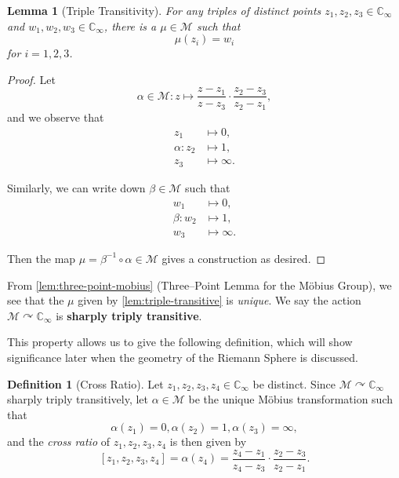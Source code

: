 \documentclass{article}
\newtheorem{lemma}[theorem]{Lemma}
\theoremstyle{definition}
\newtheorem{definition}[theorem]{Definition}
\theoremstyle{remark}
\newcommand{\pqty}[1]{\left(#1\right)}
\newcommand{\bqty}[1]{\left[#1\right]}
\newcommand{\functionmap}[3]{#1:#2\mapsto #3}
\newcommand{\inverse}{^{-1}}
\newcommand{\actson}{\curvearrowright}
\newcommand{\CC}{\mathbb{C}}
\newcommand{\compactify}{_{\infty}}
\newcommand{\mobius}{\mathcal{M}}
\begin{document}
\begin{lemma}[Triple Transitivity]
    \label{lem:triple-transitive}%
    For any triples of distinct points \(z_1, z_2, z_3 \in \CC\compactify\) and \(w_1, w_2, w_3 \in \CC\compactify\), there is a \(\mu \in \mobius\) such that
    \[
        \mu\pqty{z_i} = w_i
    \]
    for \(i = 1, 2, 3\).
\end{lemma}

\begin{proof}
    Let
    \[
        \functionmap{\alpha \in \mobius}{z}{\frac{z - z_1}{z - z_3} \cdot \frac{z_2 - z_3}{z_2 - z_1},}
    \]
    and we observe that
    \begin{align*}
        z_1 & \mapsto 0, \\
        \alpha: z_2 & \mapsto 1, \\
        z_3 & \mapsto \infty.
    \end{align*}

    Similarly, we can write down \(\beta \in \mobius\) such that
    \begin{align*}
        w_1 & \mapsto 0, \\
        \beta: w_2 & \mapsto 1, \\
        w_3 & \mapsto \infty.
    \end{align*}

    Then the map \(\mu = \beta\inverse \circ \alpha \in \mobius\) gives a construction as desired.
\end{proof}

From \autoref{lem:three-point-mobius} (Three--Point Lemma for the M\"{o}bius Group), we see that the \(\mu\) given by \autoref{lem:triple-transitive} is \emph{unique}. We say the action \(\mobius \actson \CC\compactify\) is \textbf{sharply triply transitive}.

This property allows us to give the following definition, which will show significance later when the geometry of the Riemann Sphere is discussed.

\begin{definition}[Cross Ratio]
    \label{def:cross-ratio}%
    Let \(z_1, z_2, z_3, z_4 \in \CC_{\infty}\) be distinct. Since \(\mobius \actson \CC\compactify\) sharply triply transitively, let \(\alpha \in \mobius\) be the unique M\"{o}bius transformation such that
    \[
        \alpha\pqty{z_1} = 0, \alpha\pqty{z_2} = 1, \alpha\pqty{z_3} = \infty,
    \]
    and the \emph{cross ratio} of \(z_1, z_2, z_3, z_4\) is then given by
    \[
        \bqty{z_1, z_2, z_3, z_4} = \alpha\pqty{z_4} = \frac{z_4 - z_1}{z_4 - z_3} \cdot \frac{z_2 - z_3}{z_2 - z_1}.
    \]
\end{definition}
\end{document}
